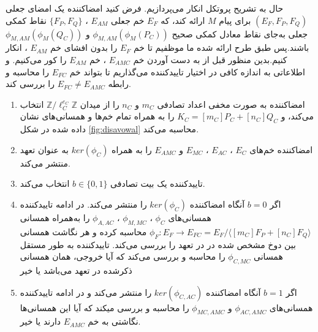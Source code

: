 \documentclass[12pt,a4paper]{article}
\theoremstyle{plain}
\theoremstyle{definition}
\theoremstyle{remark}
\begin{document}
حال به تشریح پروتکل انکار می‌پردازیم. فرض کنید امضاکننده یک امضای جعلی
$(E_F,F_P,F_Q)$
برای پیام 
$M$
ارائه کند، که 
$E_F$
خم جعلی 
$E_{AM}$
،
$\{F_P,F_Q\}$
نقاط کمکی جعلی به‌جای نقاط معادل کمکی صحیح
$\phi_{M,AM}(\phi_M(P_C))$
و
$\phi_{M,AM}(\phi_M(Q_C))$
باشند.پس طبق طرح ارائه شده ما موظفیم تا خم
$E_F$
را بدون افشای خم
$E_{AM}$
، انکار کنیم.بدین منظور قبل از به دست آوردن خم
$E_{AMC}$
،
خم
$E_{AM}$
را کور می‌کنیم. و  اطلاعاتی به اندازه کافی در اختیار تاییدکننده می‌گذاریم تا بتواند خم
$E_{FC}$
را محاسبه و رابطه
$E_{FC} \ne E_{AMC}$
را بررسی کند.
\begin{enumerate}
	\item 
	امضاکننده به صورت مخفی اعداد تصادفی 
	$m_C$
	و
	$n_C$
	را از میدان
	$\mathbb{Z} / \ell_C^{e_C} \mathbb{Z}$
	انتخاب می‌کند، و 
	$K_C = [m_C]P_C + [n_C]Q_C$
	را به همراه تمام خم‌ها و همسانی‌های نشان داده شده در شکل 
\ref{fig:disavowal}
	 محاسبه می‌کند.
	
	\item 
	امضاکننده خم‌های
	$E_C$
	،
	$E_{AC}$
	،
	$E_{MC}$
	و
	$E_{AMC}$
	را به همراه 
	$ker(\phi_C)$
	به عنوان تعهد منتشر می‌کند.
	
	\item 
	تاییدکننده یک بیت تصادفی
	$b \in \{0,1\}$
	انتخاب می‌کند.
	
	\item 
	اگر
	$b=0$
	آنگاه امضاکننده 
	$ker(\phi_C)$
	را منتشر می‌کند. در ادامه تاییدکننده همسانی‌های 
	$\phi_C$
	،
	$\phi_{M,MC}$
	،
	$\phi_{A,AC}$
	را به‌همراه همسانی
	$\phi_F : E_F \rightarrow E_{FC} = E_F / \langle [m_C]F_P + [n_C]F_Q \rangle$
	محاسبه کرده و هر نگاشت همسانی بین دوخ مشخص شده در در تعهد را بررسی می‌کند. تاییدکننده به طور مستقل همسانی
	$\phi_{C,MC}$
	را محاسبه و بررسی می‌کند که آیا خروجی، همان همسانی ذکرشده در تعهد می‌باشد یا خیر
	
	\item 
	اگر 
	$b=1$
	آنگاه امضاکننده 
	$ker(\phi_{C,AC})$
	را منتشر می‌کند و در ادامه تاییدکننده همسانی‌های 
	$\phi_{AC,AMC}$
	و
	$\phi_{MC,AMC}$
	را محاسبه و بررسی میکند که آیا این همسانی‌ها نگاشتی به خم
	$E_{AMC}$
	دارند یا خیر.
\end{enumerate}
\end{document}
